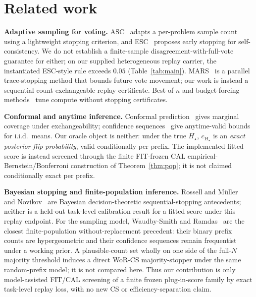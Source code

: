 \documentclass{article}
\theoremstyle{definition}
\theoremstyle{remark}
\newcommand{\trueH}{H_\star}
\newcommand{\oraclecert}{c_{\trueH}}
\begin{document}
\section{Related work}
\label{sec:related}

\textbf{Adaptive sampling for voting.} ASC~\citep{aggarwal2023asc} adapts a
per-problem sample count using a lightweight stopping criterion, and
ESC~\citep{li2024esc} proposes early stopping for self-consistency. We do not
establish a finite-sample disagreement-with-full-vote guarantee for either;
on our supplied heterogeneous replay carrier, the instantiated ESC-style rule
exceeds $0.05$ (Table~\ref{tab:main}). MARS~\citep{chen2026mars} is a
parallel trace-stopping method that bounds future vote movement; our work is
instead a sequential count-exchangeable replay certificate. Best-of-$n$ and budget-forcing
methods~\citep{snell2024scaling} tune compute without stopping certificates.

\textbf{Conformal and anytime inference.} Conformal
prediction~\citep{vovk2005algorithmic} gives marginal coverage under
exchangeability; confidence sequences~\citep{howard2021cs} give anytime-valid
bounds for i.i.d.\ means. Our oracle object is neither: under the true
$\trueH$, $\oraclecert$ is an \emph{exact posterior flip probability}, valid
conditionally per prefix. The implemented fitted score is instead screened
through the finite FIT-frozen CAL empirical-Bernstein/Bonferroni construction
of Theorem~\ref{thm:pop}; it is not claimed conditionally exact per prefix.

\textbf{Bayesian stopping and finite-population inference.} Rossell and
M\"uller~\citep{RossellMuller2013SequentialStopping} and
Novikov~\citep{Novikov2010OptimalSequential} are Bayesian
decision-theoretic sequential-stopping antecedents; neither is a held-out
task-level calibration result for a fitted score under this replay endpoint.
For the sampling model, Waudby-Smith and
Ramdas~\citep{WaudbySmithRamdas2020Confidence} are the closest
finite-population without-replacement precedent: their binary prefix counts
are hypergeometric and their confidence sequences remain frequentist under a
working prior. A plausible-count set wholly on one side of the full-$N$
majority threshold induces a direct WoR-CS majority-stopper under the same
random-prefix model; it is not compared here. Thus our contribution is only
model-assisted FIT/CAL screening of a finite frozen plug-in-score family by
exact task-level replay loss, with no new CS or efficiency-separation claim.
\end{document}
